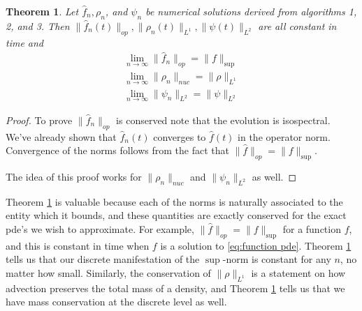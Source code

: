 \documentclass[final,leqno]{siamltex1213}
\newtheorem{thm}{Theorem}[section]
\begin{document}
\begin{thm} \label{thm:norms}
	Let $\hat{f}_{n}, \rho_{n}$, and $\psi_{n}$ be numerical solutions derived from algorithms 1, 2, and 3.
	Then $\| \hat{f}_{n}(t) \|_{op}, \|\rho_{n}(t)\|_{L^{1}} , \| \psi (t)\|_{L^{2}}$ are all constant in time
	and
	\begin{align}
		\lim_{n \to \infty} \| \hat{f}_{n} \|_{op} = \| f \|_{\sup} \\
		\lim_{n \to \infty} \| \rho_{n} \|_{nuc} = \| \rho \|_{L^{1}} \\
		\lim_{n \to \infty} \| \psi_{n} \|_{L^{2}} = \| \psi \|_{L^{2}}
	\end{align}
\end{thm}
\begin{proof}
	To prove $\| \hat{f}_{n} \|_{op}$ is conserved note that the evolution is isospectral.
	We've already shown that $\hat{f}_{n}(t)$ converges to $\hat{f}(t)$ in the operator norm.
	Convergence of the norms follows from the fact that $\| \hat{f} \|_{op} = \| f \|_{\sup}$.
	
	The idea of this proof works for $\| \rho_{n} \|_{nuc}$ and $\| \psi_{n} \|_{L^{2}}$ as well.
\end{proof}

Theorem \ref{thm:norms} is valuable because each of the norms is naturally associated to the entity which it bounds, and these quantities are exactly conserved for the exact pde's we wish to approximate.
For example, $\| \hat{f} \|_{op} = \| f \|_{\sup}$ for a function $f$, and this is constant in time when $f$ is a solution to \eqref{eq:function pde}.
Theorem \ref{thm:norms} tells us that our discrete manifestation of the $\sup$-norm is constant for any $n$, no matter how small.
Similarly, the conservation of $\| \rho \|_{L^{1}}$ is a statement on how advection preserves the total mass of a density, and Theorem \ref{thm:norms} tells us that we have mass conservation at the discrete level as well.
\end{document}
